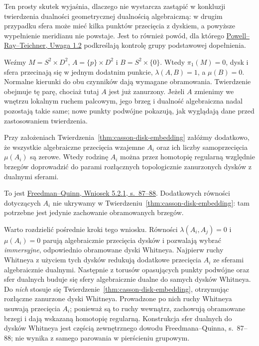 Ten prosty skutek wyjaśnia, dlaczego nie wystarcza
zastąpić w konkluzji twierdzenia dualności
geometrycznej dualnością algebraiczną: w drugim
przypadku sfera może mieć kilka punktów przecięcia
z dyskiem, a powyższe wypełnienie meridianu nie
powstaje. Jest to również powód, dla którego
\href{https://arxiv.org/pdf/2006.05209}
{Powell--Ray--Teichner, Uwaga 1.2} podkreślają
kontrolę grupy podstawowej dopełnienia.

\begin{przyklad}
\label{prz:casson-dual-product}
Weźmy $M=S^2\times D^2$,
$A=\{p\}\times D^2$ i $B=S^2\times\{0\}$.
Wtedy $\pi_1(M)=0$, dysk i sfera przecinają się
w jednym dodatnim punkcie, $\lambda(A,B)=1$,
a $\mu(B)=0$. Normalne kierunki do obu czynników
dają wymagane obramowania. Twierdzenie obejmuje
tę parę, chociaż tutaj $A$ jest już zanurzony.
Jeżeli $A$ zmienimy we wnętrzu lokalnym ruchem
palcowym, jego brzeg i dualność
algebraiczna nadal pozostają takie same;
nowe punkty podwójne pokazują, jak wyglądają
dane przed zastosowaniem twierdzenia.
\end{przyklad}

\begin{wniosek}
\label{cor:casson-regular-homotopy}
Przy założeniach Twierdzenia~\ref{thm:casson-disk-embedding}
załóżmy dodatkowo, że wszystkie algebraiczne
przecięcia wzajemne $A_i$ oraz ich liczby
samoprzecięcia $\mu(A_i)$ są zerowe.
Wtedy rodzinę $A_i$ można przez homotopię
regularną względnie brzegów doprowadzić do
parami rozłącznych topologicznie zanurzonych
dysków z dualnymi sferami.
\end{wniosek}

To jest \href{https://archive.mpim-bonn.mpg.de/4789/2/FreedmanQuinn-TopologyOf4Manifolds-Reformatted2013.pdf}
{Freedman--Quinn, Wniosek 5.2.1, s.\ 87--88}.
Dodatkowych równości dotyczących $A_i$ nie
ukrywamy w Twierdzeniu~\ref{thm:casson-disk-embedding}:
tam potrzebne jest jedynie zachowanie
obramowanych brzegów.

Warto rozdzielić pośrednie kroki tego wniosku.
Równości $\lambda(A_i,A_j)=0$ i $\mu(A_i)=0$
parują algebraicznie przecięcia dysków i pozwalają
wybrać \emph{immersyjne}, odpowiednio obramowane
dyski Whitneya. Najpierw ruchy Whitneya
z użyciem tych dysków
redukują dodatkowe przecięcia $A_i$ ze sferami
algebraicznie dualnymi. Następnie z torusów
opasujących punkty podwójne oraz sfer dualnych
buduje się sfery algebraicznie dualne do samych
dysków Whitneya. Do \emph{nich} stosuje się
Twierdzenie~\ref{thm:casson-disk-embedding},
otrzymując rozłączne zanurzone dyski Whitneya.
Prowadzone po nich ruchy Whitneya usuwają
przecięcia $A_i$; ponieważ są to ruchy wewnątrz,
zachowują obramowane brzegi i dają wskazaną
homotopię regularną. Konstrukcja sfer dualnych
do dysków Whitneya jest częścią zewnętrznego
dowodu Freedmana--Quinna, s.\ 87--88; nie wynika
z samego parowania w pierścieniu grupowym.

